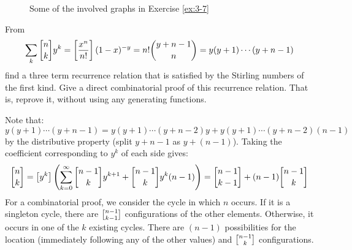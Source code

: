 \begin{solution}
\begin{figure}[hbpt]
    \caption{Some of the involved graphs in Exercise \ref{ex:3-7}}
    \label{fig:3:7}
    \end{figure}
\end{solution}

\begin{exercise}
    \label{ex:3-8}
    From 
    \[
        \sum_k \stirlingFst{n}{k} y^k = \coeff{\frac{x^n}{n!}}(1-x)^{-y} = n! \binom{y+n-1}{n} = y(y+1)\cdots (y+n-1)
    \] find a three term recurrence relation that is satisfied by the Stirling numbers of the first kind. Give a direct combinatorial proof of this recurrence relation. That is, reprove it, without using any generating functions.
\end{exercise}
\begin{solution}
    Note that:
    \[
        y(y+1)\cdots (y+n-1) = y(y+1)\cdots(y+n-2)y + y(y+1)\cdots (y+n-2)(n-1)  
    \]
    by the distributive property (split $y+n-1$ as $y + (n-1)$). Taking the coefficient corresponding to $y^k$ of each side gives:
    \[
        \stirlingFst{n}{k} = \coeff{y^k} \left(\bsum[k] \stirlingFst{n-1}{k}y^{k+1} + \stirlingFst{n-1}{k}y^k(n-1)\right) = \stirlingFst{n-1}{k-1} + (n-1)\stirlingFst{n-1}{k}
    \]
    For a combinatorial proof, we consider the cycle in which $n$ occurs. If it is a singleton cycle, there are $\stirlingFst{n-1}{k-1}$ configurations of the other elements. Otherwise, it occurs in one of the $k$ existing cycles. There are $(n-1)$ possibilities for the location (immediately following any of the other values) and $\stirlingFst{n-1}{k}$ configurations.
\end{solution}

